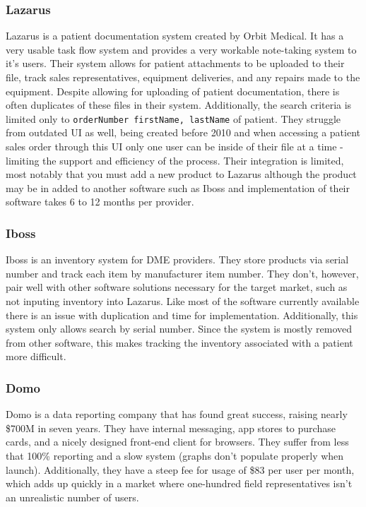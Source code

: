 \documentclass[letterpaper]{article}
\begin{document}
  \subsubsection{Lazarus}
  Lazarus is a patient documentation system created by Orbit Medical. It has a very usable task flow system and provides a very workable note-taking system to it’s users. Their system allows for patient attachments to be uploaded to their file, track sales representatives, equipment deliveries, and any repairs made to the equipment.
%
  Despite allowing for uploading of patient documentation, there is often duplicates of these files in their system. Additionally, the search criteria is limited only to \texttt{orderNumber firstName, lastName} of patient. They struggle from outdated UI as well, being created before 2010 and when accessing a patient sales order through this UI only one user can be inside of their file at a time - limiting the support and efficiency of the process. Their integration is limited, most notably that you must add a new product to Lazarus although the product may be in added to another software such as Iboss and implementation of their software takes 6 to 12 months per provider.
%
  \subsubsection{Iboss}
  Iboss is an inventory system for DME providers. They store products via serial number and track each item by manufacturer item number. They don’t, however, pair well with other software solutions necessary for the target market, such as not inputing inventory into Lazarus. Like most of the software currently available there is an issue with duplication and time for implementation. Additionally, this system only allows search by serial number. Since the system is mostly removed from other software, this makes tracking the inventory associated with a patient more difficult.
%
  \subsubsection{Domo}
  Domo is a data reporting company that has found great success, raising nearly \$700M in seven years. They have internal messaging, app stores to purchase cards, and a nicely designed front-end client for browsers. They suffer from less that 100\% reporting and a slow system (graphs don’t populate properly when launch). Additionally, they have a steep fee for usage of \$83 per user per month, which adds up quickly in a market where one-hundred field representatives isn’t an unrealistic number of users.
%
\end{document}

